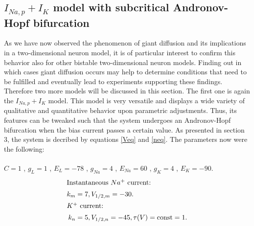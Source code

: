 \documentclass[12pt,a4paper]{article}
\begin{document}
\subsection{$I_{Na,p}+I_K$ model with subcritical Andronov-Hopf bifurcation}
As we have now observed the phenomenon of giant diffusion and its implications in a two-dimensional neuron model, it is of particular interest to confirm this behavior also for other bistable two-dimensional neuron models. Finding out in which cases giant diffusion occurs may help to determine conditions that need to be fulfilled and eventually lead to experiments supporting these findings. Therefore two more models will be discussed in this section.
The first one is again the $I_{Na,p}+I_K$ model.
This model is very versatile and displays a wide variety of qualitative and quantitative behavior upon parametric adjustments. Thus, its features can be tweaked such that the system undergoes an Andronov-Hopf bifurcation when the bias current passes a certain value. As presented in section 3, the system is decribed by equations \ref{Veq} and \ref{neq}. The parameters now were the following:\\\\
$C=1$ , $g_L=1$ , $E_L=-78$ , $g_{Na}=4$ , $E_{Na}=60$ , $g_K=4$ , $E_K=-90$.
\begin{align*}
\intertext{Instantaneous $Na^+$ current:} k_m&=7 , V_{1/2,m}=-30. 
\\
\intertext{$K^+$ current:} k_n&=5 , V_{1/2,n}=-45 , \tau(V)=\text{const}=1.
\end{align*}
\end{document}
